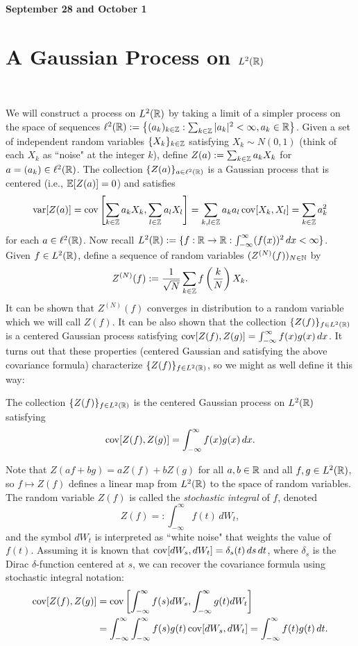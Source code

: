 \documentclass[../../../Master/AppliedStochastics.tex]{subfiles}
\author{Joe}
\date{26 September 2018}
\begin{document}
%


\makelecture



\textbf{\Large September 28 and October 1}

\section{A Gaussian Process on $L^2(\mathbb{R})$}\

We will construct a process on $L^2(\mathbb{R})$ by taking a limit of a simpler process on the space of sequences $\ell^2(\mathbb{R}):=\left\{(a_k)_{k\in\mathbb{Z}}:\sum_{k\in\mathbb{Z}}|a_k|^2<\infty,a_k\in\mathbb{R}\right\}$. Given a set of independent random variables $\{X_k\}_{k\in\mathbb{Z}}$ satisfying $X_k\sim N(0,1)$ (think of each $X_k$ as ``noise" at the integer $k$), define $Z(a):=\sum_{k\in\mathbb{Z}}a_kX_k$ for $a=(a_k)\in\ell^2(\mathbb{R})$. The collection $\{Z(a)\}_{a\in\ell^2(\mathbb{R})}$ is a Gaussian process that is centered (i.e., $\mathbb{E}[Z(a)]=0$) and satisfies $$\operatorname{var}[Z(a)]=\operatorname{cov}\left[\sum_{k\in\mathbb{Z}}a_kX_k,\sum_{l\in\mathbb{Z}}a_lX_l\right]=\sum_{k,l\in\mathbb{Z}}a_ka_l\operatorname{cov}[X_k,X_l]=\sum_{k\in\mathbb{Z}}a_k^2$$ for each $a\in\ell^2(\mathbb{R})$. Now recall $L^2(\mathbb{R}):=\{f:\mathbb{R}\to\mathbb{R}:\int_{-\infty}^\infty(f(x))^2\,dx<\infty\}$. Given $f\in L^2(\mathbb{R})$, define a sequence of random variables $(Z^{(N)}(f))_{N\in\mathbb{N}}$ by $$Z^{(N)}(f):=\frac{1}{\sqrt{N}}\sum_{k\in\mathbb{Z}}f\left(\frac{k}{N}\right)X_k.$$ It can be shown that $Z^{(N)}(f)$ converges in distribution to a random variable which we will call $Z(f)$. It can be also shown that the collection $\{Z(f)\}_{f\in L^2(\mathbb{R})}$ is a centered Gaussian process satisfying $\operatorname{cov}[Z(f),Z(g)]=\int_{-\infty}^\infty f(x)g(x)\,dx$. It turns out that these properties (centered Gaussian and satisfying the above covariance formula) characterize $\{Z(f)\}_{f\in L^2(\mathbb{R})}$, so we might as well define it this way:

\begin{defn}
The collection $\{Z(f)\}_{f\in L^2(\mathbb{R})}$ is the centered Gaussian process on $L^2(\mathbb{R})$ satisfying $$\operatorname{cov}[Z(f),Z(g)]=\int_{-\infty}^\infty f(x)g(x)\,dx.$$
\end{defn} 

Note that $Z(af+bg)=aZ(f)+bZ(g)$ for all $a,b\in\mathbb{R}$ and all $f,g\in L^2(\mathbb{R})$, so $f\mapsto Z(f)$ defines a linear map from $L^2(\mathbb{R})$ to the space of random variables. The random variable $Z(f)$ is called the \emph{stochastic integral} of $f$, denoted $$Z(f)=:\int_{-\infty}^\infty f(t)\,dW_t,$$ and the symbol $dW_t$ is interpreted as ``white noise" that weights the value of $f(t)$. Assuming it is known that $\operatorname{cov}[dW_s,dW_t]=\delta_s(t)\,ds\,dt$, where $\delta_s$ is the Dirac $\delta$-function centered at $s$, we can recover the covariance formula using stochastic integral notation:
\begin{align*}
\operatorname{cov}[Z(f),Z(g)]&=\operatorname{cov}\left[\int_{-\infty}^\infty f(s)dW_s,\int_{-\infty}^\infty g(t)dW_t\right]\\
&=\int_{-\infty}^\infty\int_{-\infty}^\infty f(s)g(t)\operatorname{cov}[dW_s,dW_t]=\int_{-\infty}^\infty f(t)g(t)\,dt.
\end{align*}
\end{document}
